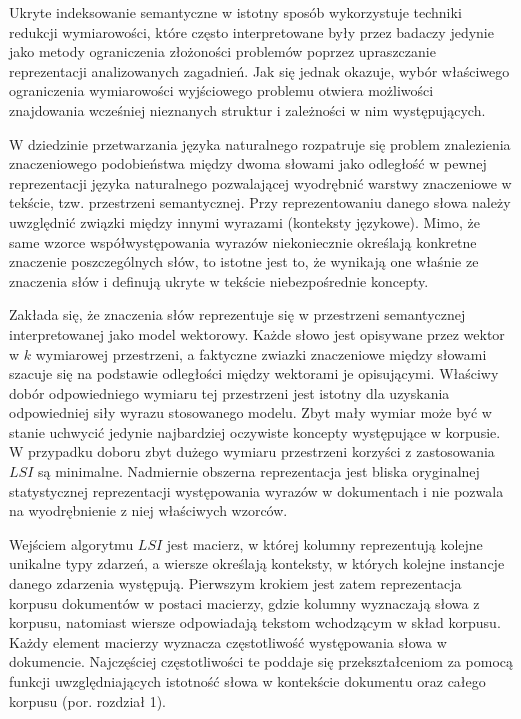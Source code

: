 \documentclass{pracamgr}
\begin{document}
Ukryte indeksowanie semantyczne w istotny sposób wykorzystuje techniki redukcji wymiarowości, które często interpretowane były przez badaczy jedynie jako metody ograniczenia złożoności problemów poprzez upraszczanie reprezentacji analizowanych zagadnień. Jak się jednak okazuje, wybór właściwego ograniczenia wymiarowości wyjściowego problemu otwiera możliwości znajdowania wcześniej nieznanych struktur i zależności w nim występujących. 

W dziedzinie przetwarzania języka naturalnego rozpatruje się problem znalezienia znaczeniowego podobieństwa między dwoma słowami jako odległość w pewnej reprezentacji języka naturalnego pozwalającej wyodrębnić warstwy znaczeniowe w tekście, tzw. przestrzeni semantycznej. Przy reprezentowaniu danego słowa należy uwzględnić związki między innymi wyrazami (konteksty językowe). Mimo, że same wzorce współwystępowania wyrazów niekoniecznie określają konkretne znaczenie poszczególnych słów, to istotne jest to, że wynikają one właśnie ze znaczenia słów i definują ukryte w tekście niebezpośrednie koncepty.

Zakłada się, że znaczenia słów reprezentuje się w przestrzeni semantycznej interpretowanej jako model wektorowy. Każde słowo jest opisywane przez wektor w $k$ wymiarowej przestrzeni, a faktyczne zwiazki znaczeniowe między słowami szacuje się na podstawie odległości między wektorami je opisującymi. Właściwy dobór odpowiedniego wymiaru tej przestrzeni jest istotny dla uzyskania odpowiedniej siły wyrazu stosowanego modelu. Zbyt mały wymiar może być w stanie uchwycić jedynie najbardziej oczywiste koncepty występujące w korpusie. W przypadku doboru zbyt dużego wymiaru przestrzeni korzyści z zastosowania $LSI$ są minimalne. Nadmiernie obszerna reprezentacja jest bliska oryginalnej statystycznej reprezentacji występowania wyrazów w dokumentach i nie pozwala na wyodrębnienie z niej właściwych wzorców.

Wejściem algorytmu $LSI$ jest macierz, w której kolumny reprezentują kolejne unikalne typy zdarzeń, a wiersze określają konteksty, w których kolejne instancje danego zdarzenia występują. Pierwszym krokiem jest zatem reprezentacja korpusu dokumentów w postaci macierzy, gdzie kolumny wyznaczają słowa z korpusu, natomiast wiersze odpowiadają tekstom wchodzącym w skład korpusu. Każdy element macierzy wyznacza częstotliwość występowania słowa w dokumencie. Najczęściej częstotliwości te poddaje się przekształceniom za pomocą funkcji uwzględniających istotność słowa w kontekście dokumentu oraz całego korpusu (por. rozdział 1).
\end{document}
